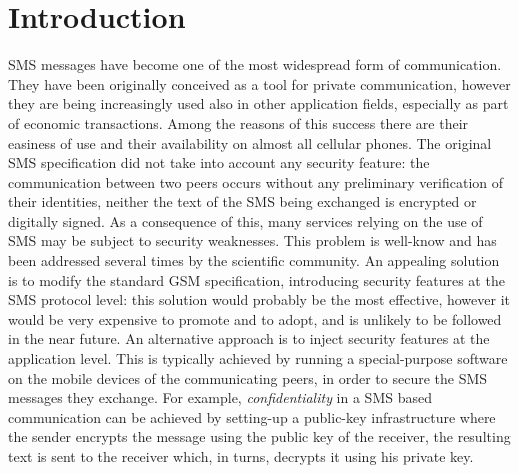 \documentclass[authoryear]{elsarticle}
\begin{document}
\section{Introduction}


SMS messages have become one of the most widespread form of communication. They have been originally conceived as a tool for private communication, however they are being increasingly used also in other application fields, especially as part of economic transactions. Among the reasons of this success there are their easiness of use and their availability on almost all cellular phones. The original SMS specification did not take into account any security feature: the communication between two peers occurs without any preliminary verification of their identities, neither the text of the SMS being exchanged is encrypted or digitally signed. As a consequence of this, many services relying on the use of SMS may be subject to security weaknesses. This problem is well-know and has  been addressed several times by the scientific community. An appealing solution is to modify the standard GSM specification, introducing security features at the SMS protocol level: this solution would probably be the most effective, however it would be very expensive to promote and to adopt, and is unlikely to be followed in the near future. An alternative approach is to inject security features at the application level. This is typically achieved by running a special-purpose software on the mobile devices of the communicating peers, in order to secure the SMS messages they exchange.  For example, {\em confidentiality} in a SMS based communication can be achieved by setting-up a public-key infrastructure where the sender encrypts the message using the public key of the receiver, the resulting text is sent to the receiver which, in turns, decrypts it using his private key. 
\end{document}
